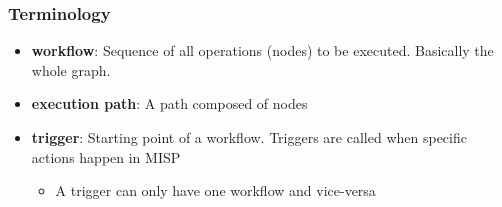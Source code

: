 \begin{frame}
    \frametitle{Terminology}
    \begin{itemize}
        \item \textbf{workflow}: Sequence of all operations (nodes) to be executed. Basically the whole graph.
        \item \textbf{execution path}: A path composed of nodes
        \item \textbf{trigger}: Starting point of a workflow. Triggers are called when specific actions happen in MISP
        \begin{itemize}
            \item A trigger can only have one workflow and vice-versa
        \end{itemize}
    \end{itemize}
    \begin{center}
    \end{center}
\end{frame}

